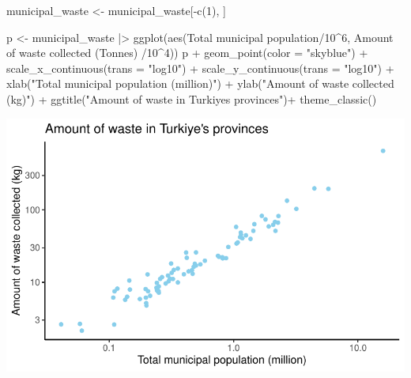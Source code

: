 \documentclass[
  11pt,
  a4paper,
  DIV=11,
  numbers=noendperiod]{scrartcl}
\newenvironment{Shaded}{\begin{snugshade}}{\end{snugshade}}
\newcommand{\AttributeTok}[1]{\textcolor[rgb]{0.40,0.45,0.13}{#1}}
\newcommand{\DecValTok}[1]{\textcolor[rgb]{0.68,0.00,0.00}{#1}}
\newcommand{\FunctionTok}[1]{\textcolor[rgb]{0.28,0.35,0.67}{#1}}
\newcommand{\NormalTok}[1]{\textcolor[rgb]{0.00,0.23,0.31}{#1}}
\newcommand{\OtherTok}[1]{\textcolor[rgb]{0.00,0.23,0.31}{#1}}
\newcommand{\SpecialCharTok}[1]{\textcolor[rgb]{0.37,0.37,0.37}{#1}}
\newcommand{\StringTok}[1]{\textcolor[rgb]{0.13,0.47,0.30}{#1}}
\begin{document}
\begin{Shaded}
\begin{Highlighting}[]
\NormalTok{municipal\_waste }\OtherTok{\textless{}{-}}\NormalTok{ municipal\_waste[}\SpecialCharTok{{-}}\FunctionTok{c}\NormalTok{(}\DecValTok{1}\NormalTok{), ]}

\NormalTok{p }\OtherTok{\textless{}{-}}\NormalTok{ municipal\_waste }\SpecialCharTok{|\textgreater{}} \FunctionTok{ggplot}\NormalTok{(}\FunctionTok{aes}\NormalTok{(}\StringTok{\textasciigrave{}}\AttributeTok{Total municipal population}\StringTok{\textasciigrave{}}\SpecialCharTok{/}\DecValTok{10}\SpecialCharTok{\^{}}\DecValTok{6}\NormalTok{, }
\StringTok{\textasciigrave{}}\AttributeTok{Amount of waste collected (Tonnes) }
\StringTok{\textasciigrave{}}\SpecialCharTok{/}\DecValTok{10}\SpecialCharTok{\^{}}\DecValTok{4}\NormalTok{)) }
\NormalTok{p }\SpecialCharTok{+} \FunctionTok{geom\_point}\NormalTok{(}\AttributeTok{color =} \StringTok{"skyblue"}\NormalTok{) }\SpecialCharTok{+} 
\FunctionTok{scale\_x\_continuous}\NormalTok{(}\AttributeTok{trans =} \StringTok{"log10"}\NormalTok{) }\SpecialCharTok{+}
\FunctionTok{scale\_y\_continuous}\NormalTok{(}\AttributeTok{trans =} \StringTok{"log10"}\NormalTok{) }\SpecialCharTok{+}
\FunctionTok{xlab}\NormalTok{(}\StringTok{"Total municipal population (million)"}\NormalTok{) }\SpecialCharTok{+}
\FunctionTok{ylab}\NormalTok{(}\StringTok{"Amount of waste collected (kg)"}\NormalTok{) }\SpecialCharTok{+}
\FunctionTok{ggtitle}\NormalTok{(}\StringTok{"Amount of waste in Turkiye\textquotesingle{}s provinces"}\NormalTok{)}\SpecialCharTok{+} 
\FunctionTok{theme\_classic}\NormalTok{()}
\end{Highlighting}
\end{Shaded}

\includegraphics{project_files/figure-pdf/unnamed-chunk-13-1.pdf}
\end{document}
